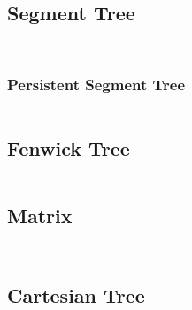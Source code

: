 \documentclass[8pt,a4paper,landscape,oneside]{amsart}
\newcommand{\code}[1]{\inputminted[fontsize=\normalsize,baselinestretch=1]{cpp}{_code/#1}}
\newif\ifverbose
\begin{document}
\begin{multicols*}{3}
    \subsection{Segment Tree}
        \ifverbose
        An implementation of a Segment Tree.
        \fi
        \code{data-structures/segment_tree_node.cpp}
        \ifverbose
        \code{data-structures/segment_tree_mnnode.cpp}
        \fi
        \code{data-structures/segment_tree.cpp}

        \subsubsection{Persistent Segment Tree}
        \code{data-structures/persistent_segment_tree.cpp}

    \subsection{Fenwick Tree}
        \ifverbose
        A Fenwick Tree is a data structure that represents an array of $n$
        numbers. It supports adjusting the $i$-th element in $O(\log n)$ time,
        and computing the sum of numbers in the range $i..j$ in $O(\log n)$
        time. It only needs $O(n)$ space.
        \fi
        \code{data-structures/fenwick_tree.cpp}

    \subsection{Matrix}
        \ifverbose
        A Matrix class.
        \fi
        \code{data-structures/matrix.cpp}

    \ifverbose
    \subsection{AVL Tree}
        \ifverbose
        A fast, easily augmentable, balanced binary search tree.
        \fi
        \code{data-structures/avl_tree.cpp}

        \ifverbose
        Also a very simple wrapper over the AVL tree that implements a map
        interface.
        \code{data-structures/avl_map.cpp}
        \fi
    \fi

    \subsection{Cartesian Tree}
        \code{data-structures/cartesian_tree.cpp}

    \ifverbose

\end{multicols*}
\end{document}
